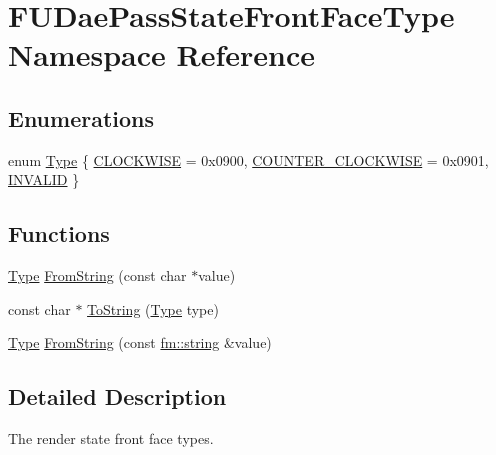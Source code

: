 \hypertarget{namespaceFUDaePassStateFrontFaceType}{
\section{FUDaePassStateFrontFaceType Namespace Reference}
\label{namespaceFUDaePassStateFrontFaceType}
}
\subsection*{Enumerations}
\begin{DoxyCompactItemize}
\item 
enum \hyperlink{namespaceFUDaePassStateFrontFaceType_a4be7a4c2574498a05f6b94662a315c8a}{Type} \{ \hyperlink{namespaceFUDaePassStateFrontFaceType_a4be7a4c2574498a05f6b94662a315c8aaf709f84dd0048b4da850c6f1513d36cf}{CLOCKWISE} =  0x0900, 
\hyperlink{namespaceFUDaePassStateFrontFaceType_a4be7a4c2574498a05f6b94662a315c8aa217704ed9cd3355630874e34f351cde5}{COUNTER\_\-CLOCKWISE} =  0x0901, 
\hyperlink{namespaceFUDaePassStateFrontFaceType_a4be7a4c2574498a05f6b94662a315c8aaae10448a4d994ea8f088ac6900791973}{INVALID}
 \}
\end{DoxyCompactItemize}
\subsection*{Functions}
\begin{DoxyCompactItemize}
\item 
\hyperlink{namespaceFUDaePassStateFrontFaceType_a4be7a4c2574498a05f6b94662a315c8a}{Type} \hyperlink{namespaceFUDaePassStateFrontFaceType_a195a9aae85ad22979dfed6cdb6b4d0c2}{FromString} (const char $\ast$value)
\item 
const char $\ast$ \hyperlink{namespaceFUDaePassStateFrontFaceType_a565d7064373942fbbbbd3ead31a5104e}{ToString} (\hyperlink{namespaceFUDaePassStateFrontFaceType_a4be7a4c2574498a05f6b94662a315c8a}{Type} type)
\item 
\hyperlink{namespaceFUDaePassStateFrontFaceType_a4be7a4c2574498a05f6b94662a315c8a}{Type} \hyperlink{namespaceFUDaePassStateFrontFaceType_aaa18a93c5ba58971ed8479600143b076}{FromString} (const \hyperlink{classfm_1_1stringT}{fm::string} \&value)
\end{DoxyCompactItemize}


\subsection{Detailed Description}
The render state front face types. 

